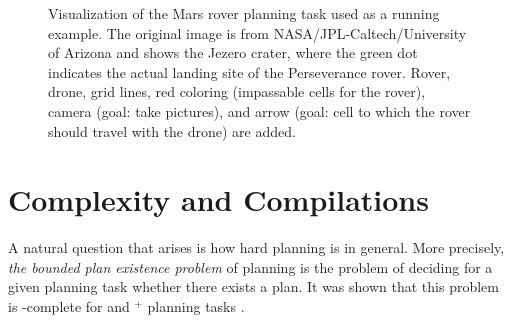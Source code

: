 \begin{example}
\end{example}

\begin{figure}
  \begin{center}
    
  \end{center}
  \caption[Visualization of the Mars rover planning task (running example).]{Visualization of the Mars rover planning task used as a running example. The original image is from NASA/JPL-Caltech/University of Arizona\protect\footnotemark{} and shows the Jezero crater, where the green dot indicates the actual landing site of the Perseverance rover.
  Rover, drone, grid lines, red coloring (impassable cells for the rover), camera (goal: take pictures), and arrow (goal: cell to which the rover should travel with the drone) are added.}
  \label{fig:mars_example}
\end{figure}

\section{Complexity and Compilations}
A natural question that arises is how hard planning is in general. More precisely, \emph{the bounded plan existence problem} of planning is the problem of deciding for a given planning task \task{} whether there exists a plan. It was shown that this problem is \PSPACE{}-complete for  \autocite{bylander-aaai1997} and $^+$ planning tasks \autocite{backstrom-nebel-compint1995}.

